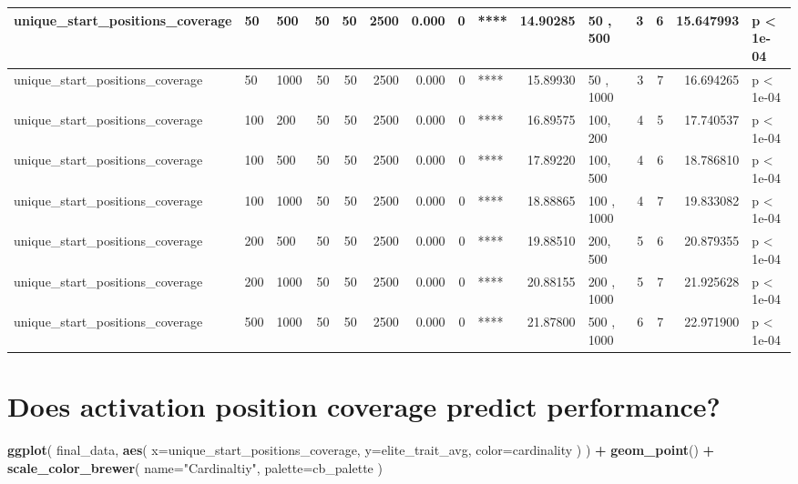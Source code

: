 \documentclass[]{book}
\newenvironment{Shaded}{\begin{snugshade}}{\end{snugshade}}
\newcommand{\DataTypeTok}[1]{\textcolor[rgb]{0.13,0.29,0.53}{#1}}
\newcommand{\KeywordTok}[1]{\textcolor[rgb]{0.13,0.29,0.53}{\textbf{#1}}}
\newcommand{\NormalTok}[1]{#1}
\newcommand{\OperatorTok}[1]{\textcolor[rgb]{0.81,0.36,0.00}{\textbf{#1}}}
\newcommand{\StringTok}[1]{\textcolor[rgb]{0.31,0.60,0.02}{#1}}
\begin{document}
\begin{tabular}{l|l|l|r|r|r|r|r|l|r|l|r|r|r|l}
\hline
unique\_start\_positions\_coverage & 50 & 500 & 50 & 50 & 2500 & 0.000 & 0 & **** & 14.90285 & 50 , 500 & 3 & 6 & 15.647993 & p < 1e-04\\
\hline
unique\_start\_positions\_coverage & 50 & 1000 & 50 & 50 & 2500 & 0.000 & 0 & **** & 15.89930 & 50  , 1000 & 3 & 7 & 16.694265 & p < 1e-04\\
\hline
unique\_start\_positions\_coverage & 100 & 200 & 50 & 50 & 2500 & 0.000 & 0 & **** & 16.89575 & 100, 200 & 4 & 5 & 17.740537 & p < 1e-04\\
\hline
unique\_start\_positions\_coverage & 100 & 500 & 50 & 50 & 2500 & 0.000 & 0 & **** & 17.89220 & 100, 500 & 4 & 6 & 18.786810 & p < 1e-04\\
\hline
unique\_start\_positions\_coverage & 100 & 1000 & 50 & 50 & 2500 & 0.000 & 0 & **** & 18.88865 & 100 , 1000 & 4 & 7 & 19.833082 & p < 1e-04\\
\hline
unique\_start\_positions\_coverage & 200 & 500 & 50 & 50 & 2500 & 0.000 & 0 & **** & 19.88510 & 200, 500 & 5 & 6 & 20.879355 & p < 1e-04\\
\hline
unique\_start\_positions\_coverage & 200 & 1000 & 50 & 50 & 2500 & 0.000 & 0 & **** & 20.88155 & 200 , 1000 & 5 & 7 & 21.925628 & p < 1e-04\\
\hline
unique\_start\_positions\_coverage & 500 & 1000 & 50 & 50 & 2500 & 0.000 & 0 & **** & 21.87800 & 500 , 1000 & 6 & 7 & 22.971900 & p < 1e-04\\
\hline
\end{tabular}

\hypertarget{does-activation-position-coverage-predict-performance}{%
\section{Does activation position coverage predict performance?}\label{does-activation-position-coverage-predict-performance}}

\begin{Shaded}
\begin{Highlighting}[]
\KeywordTok{ggplot}\NormalTok{(}
\NormalTok{    final_data,}
    \KeywordTok{aes}\NormalTok{(}
      \DataTypeTok{x=}\NormalTok{unique_start_positions_coverage,}
      \DataTypeTok{y=}\NormalTok{elite_trait_avg,}
      \DataTypeTok{color=}\NormalTok{cardinality}
\NormalTok{    )}
\NormalTok{  ) }\OperatorTok{+}
\StringTok{  }\KeywordTok{geom_point}\NormalTok{() }\OperatorTok{+}
\StringTok{  }\KeywordTok{scale_color_brewer}\NormalTok{(}
    \DataTypeTok{name=}\StringTok{"Cardinaltiy"}\NormalTok{,}
    \DataTypeTok{palette=}\NormalTok{cb_palette}
\NormalTok{  )}
\end{Highlighting}
\end{Shaded}
\end{document}
